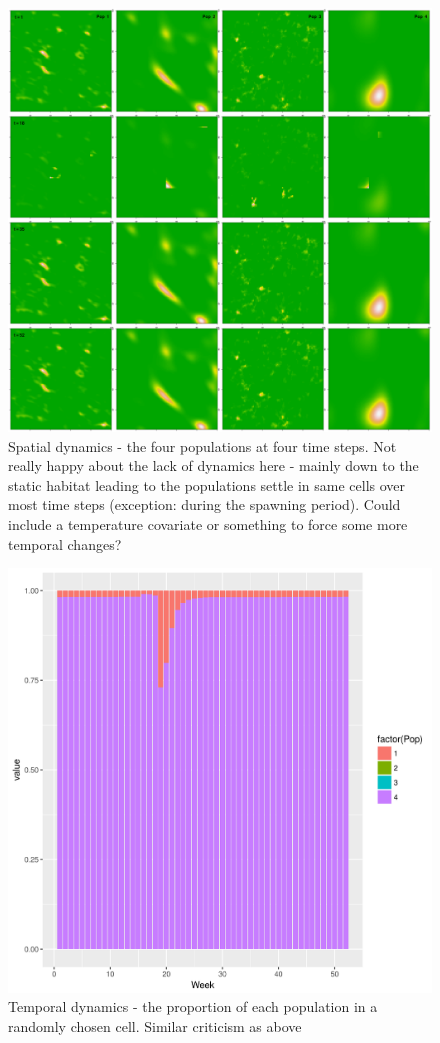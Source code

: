 \documentclass[review]{elsarticle}
\begin{document}
\begin{figure}[!ht]
	\includegraphics[width = \linewidth]{../tests/plots/pop_dist}
	\caption{Spatial dynamics - the four populations at four time steps.
		Not really happy about the lack of dynamics here - mainly down
	to the static habitat leading to the populations settle in same cells
	over most time steps (exception: during the spawning period). Could
	include a temperature covariate or something to force some more
	temporal changes?}
	\label{fig:13}
\end{figure}	

\begin{figure}[!ht]
	\includegraphics[width = \linewidth]{../tests/plots/Proportion_in_cell}
	\caption{Temporal dynamics - the proportion of each population in a
		randomly chosen cell. Similar criticism as above}
	\label{fig:14}
\end{figure}	
\end{document}
